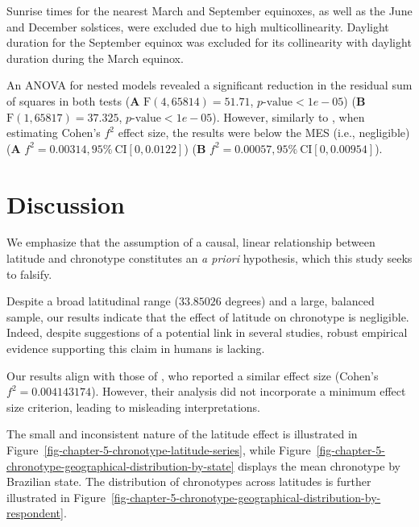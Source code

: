 \documentclass[
12pt,
openright,
oneside,
a4paper,
chapter=TITLE,
section=TITLE,
french,
spanish,
brazil,
english
]{abntex2}
\begin{document}
Sunrise times for the nearest March and September equinoxes, as well as
the June and December solstices, were excluded due to high
multicollinearity. Daylight duration for the September equinox was
excluded for its collinearity with daylight duration during the March
equinox.

An ANOVA for nested models revealed a significant reduction in the
residual sum of squares in both tests (\textbf{A}
\(\text{F}(4, 65814) = 51.71\), \(p\text{-value} < 1e-05\)) (\textbf{B}
\(\text{F}(1, 65817) = 37.325\), \(p\text{-value} < 1e-05\)). However,
similarly to \textcite{leocadio-miguel2017}, when estimating Cohen's
\(f^2\) effect size, the results were below the MES (i.e., negligible)
(\textbf{A} \(f^2 = 0.00314, 95\% \ \text{CI}[0, 0.0122]\)) (\textbf{B}
\(f^2 = 0.00057, 95\% \ \text{CI}[0, 0.00954]\)).

\section{Discussion}\label{discussion}

We emphasize that the assumption of a causal, linear relationship
between latitude and chronotype constitutes an \emph{a priori}
hypothesis, which this study seeks to falsify.

Despite a broad latitudinal range (\(33.85026\) degrees) and a large,
balanced sample, our results indicate that the effect of latitude on
chronotype is negligible. Indeed, despite suggestions of a potential
link in several studies, robust empirical evidence supporting this claim
in humans is lacking.

Our results align with those of \textcite{leocadio-miguel2017}, who
reported a similar effect size (Cohen's \(f^2 = 0.004143174\)). However,
their analysis did not incorporate a minimum effect size criterion,
leading to misleading interpretations.

The small and inconsistent nature of the latitude effect is illustrated
in Figure~\ref{fig-chapter-5-chronotype-latitude-series}, while
Figure~\ref{fig-chapter-5-chronotype-geographical-distribution-by-state}
displays the mean chronotype by Brazilian state. The distribution of
chronotypes across latitudes is further illustrated in
Figure~\ref{fig-chapter-5-chronotype-geographical-distribution-by-respondent}.
\end{document}
